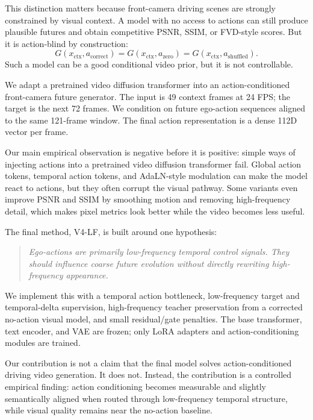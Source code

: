 \documentclass[10pt,twocolumn,letterpaper]{article}
\newcommand{\ours}{V4-LF}
\begin{document}
This distinction matters because front-camera driving scenes are strongly constrained by visual context. A model with no access to actions can still produce plausible futures and obtain competitive PSNR, SSIM, or FVD-style scores. But it is action-blind by construction:
\begin{equation}
G(x_{\mathrm{ctx}}, a_{\mathrm{correct}})
=
G(x_{\mathrm{ctx}}, a_{\mathrm{zero}})
=
G(x_{\mathrm{ctx}}, a_{\mathrm{shuffled}}).
\end{equation}
Such a model can be a good conditional video prior, but it is not controllable.

We adapt a pretrained video diffusion transformer into an action-conditioned front-camera future generator. The input is 49 context frames at 24 FPS; the target is the next 72 frames. We condition on future ego-action sequences aligned to the same 121-frame window. The final action representation is a dense 112D vector per frame.

Our main empirical observation is negative before it is positive: simple ways of injecting actions into a pretrained video diffusion transformer fail. Global action tokens, temporal action tokens, and AdaLN-style modulation can make the model react to actions, but they often corrupt the visual pathway. Some variants even improve PSNR and SSIM by smoothing motion and removing high-frequency detail, which makes pixel metrics look better while the video becomes less useful.

The final method, \ours, is built around one hypothesis:
\begin{quote}
\emph{Ego-actions are primarily low-frequency temporal control signals. They should influence coarse future evolution without directly rewriting high-frequency appearance.}
\end{quote}
We implement this with a temporal action bottleneck, low-frequency target and temporal-delta supervision, high-frequency teacher preservation from a corrected no-action visual model, and small residual/gate penalties. The base transformer, text encoder, and VAE are frozen; only LoRA adapters and action-conditioning modules are trained.

Our contribution is not a claim that the final model solves action-conditioned driving video generation. It does not. Instead, the contribution is a controlled empirical finding: action conditioning becomes measurable and slightly semantically aligned when routed through low-frequency temporal structure, while visual quality remains near the no-action baseline.
\end{document}

